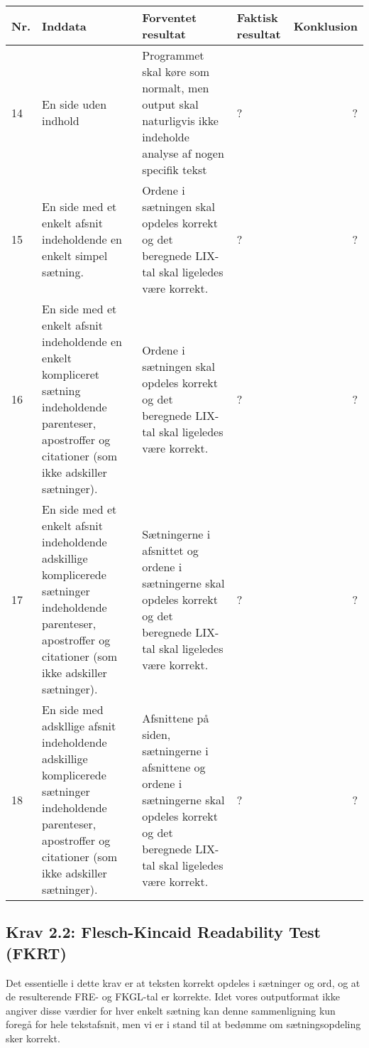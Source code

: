 \documentclass[a4paper,oneside,article]{memoir}
\begin{document}
\begin{landscape}
\begin{longtable}[c]{p{20pt}|p{220pt}|p{130pt}|p{130pt}|r}
\textbf{Nr.} &
\textbf{Inddata} &
\textbf{Forventet resultat} &
\textbf{Faktisk resultat} &
\textbf{Konklusion} \\ \hline

14 &
En side uden indhold &
Programmet skal køre som normalt, men output skal naturligvis ikke
indeholde analyse af nogen specifik tekst &
? &
? \\ \hline

15 & 
En side med et enkelt afsnit indeholdende en enkelt simpel sætning. &
Ordene i sætningen skal opdeles korrekt og det beregnede LIX-tal skal
ligeledes være korrekt. &
? &
? \\ \hline

16 & 
En side med et enkelt afsnit indeholdende en enkelt kompliceret
sætning indeholdende parenteser, apostroffer og citationer (som ikke
adskiller sætninger). &
Ordene i sætningen skal opdeles korrekt og det beregnede LIX-tal skal
ligeledes være korrekt. &
? &
? \\ \hline

17 &
En side med et enkelt afsnit indeholdende adskillige
komplicerede sætninger indeholdende parenteser, apostroffer og
citationer (som ikke adskiller sætninger). &
Sætningerne i afsnittet og ordene i sætningerne skal opdeles korrekt
og det beregnede LIX-tal skal ligeledes være korrekt. &
? &
? \\ \hline

18 &
En side med adskllige afsnit indeholdende adskillige
komplicerede sætninger indeholdende parenteser, apostroffer og
citationer (som ikke adskiller sætninger). &
Afsnittene på siden, sætningerne i afsnittene og ordene i sætningerne
skal opdeles korrekt og det beregnede LIX-tal skal ligeledes være korrekt. &
? &
? \\ \hline

\end{longtable}

\subsection{Krav 2.2: Flesch-Kincaid Readability Test (FKRT)}

Det essentielle i dette krav er at teksten korrekt opdeles i sætninger
og ord, og at de resulterende FRE- og FKGL-tal er korrekte. Idet vores
outputformat ikke angiver disse værdier for hver enkelt sætning kan
denne sammenligning kun foregå for hele tekstafsnit, men vi er i stand
til at bedømme om sætningsopdeling sker korrekt.


\end{landscape}
\end{document}
